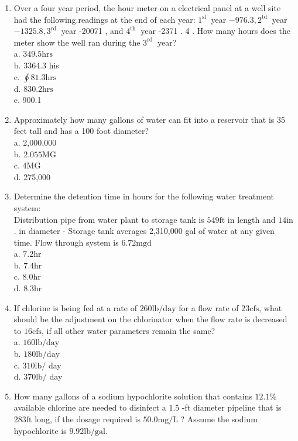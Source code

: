 \begin{enumerate}
\item Over a four year period, the hour meter on a electrical panel at a well site had the following.readings at the end of each year: $1^{\text {sl }}$ year $-976.3,2^{\text {td }}$ year $-1325.8,3^{\text {rd }}$ year -20071 , and $4^{\text {th }}$ year -2371 . 4 . How many hours does the meter show the well ran during the $3^{\text {rd }}$ year?\\
a. $349.5 \mathrm{hrs}$\\
b. 3364.3 his\\
c. $\oint 81.3 \mathrm{hrs}$\\
d. $830.2 \mathrm{hrs}$\\
e. 900.1\\
\item Approximately how many gallons of water can fit into a reservoir that is 35 feet tall and has a 100 foot diameter?\\
a. 2,000,000\\
b. $2.055 \mathrm{MG}$\\
c. $4 \mathrm{MG}$\\
d. 275,000\\
\item Determine the detention time in hours for the following water treatment system:\\
Distribution pipe from water plant to storage tank is $549 \mathrm{ft}$ in length and $14 \mathrm{in}$. in diameter - Storage tank averages 2,310,000 gal of water at any given time.  Flow through system is $6.72 \mathrm{mgd}$\\
a. $7.2 \mathrm{hr}$\\
b. $7.4 \mathrm{hr}$\\
c. $8.0 \mathrm{hr}$\\
d. $8.3 \mathrm{hr}$\\
\item If chlorine is being fed at a rate of $260 \mathrm{lb} / \mathrm{day}$ for a flow rate of $23 \mathrm{cfs}$, what should be the adjustment on the chlorinator when the flow rate is decreased to $16 \mathrm{cfs}$, if all other water parameters remain the same?\\
a. $160 \mathrm{lb} / \mathrm{day}$\\
b. $180 \mathrm{lb} / \mathrm{day}$\\
c. $310 \mathrm{lb} /$ day\\
d. $370 \mathrm{lb} /$ day\\
\item How many gallons of a sodium hypochlorite solution that contains $12.1 \%$ available chlorine are needed to disinfect a 1.5 -ft diameter pipeline that is $283 \mathrm{ft}$ long, if the dosage required is $50.0 \mathrm{mg} / \mathrm{L}$ ? Assume the sodium hypochlorite is $9.92 \mathrm{lb} / \mathrm{gal}$.\\

\end{enumerate}
